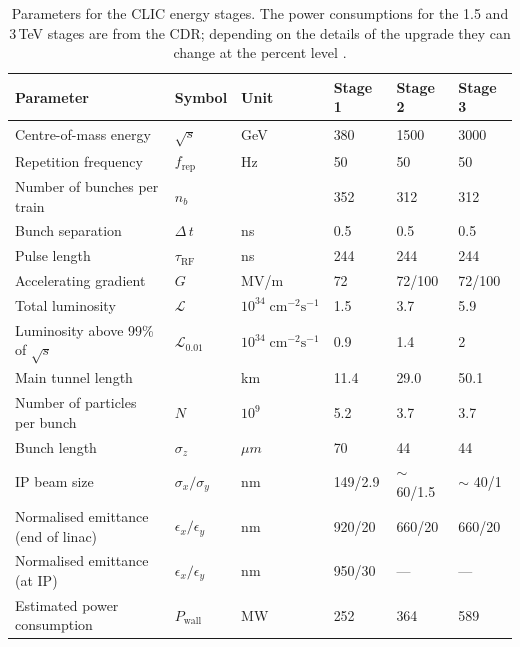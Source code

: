 \begin{table}
\caption[CLIC beam parameters]{Parameters for the CLIC energy stages. The power consumptions for the 1.5 and 3\,TeV stages are from the CDR; depending on the details of the upgrade they can change at the percent level \cite{CLIC:2016zwp}.}
\label{table:clicbeamparameters}
\centering
\begin{tabular}{l l l l l l}
\toprule
\textbf{Parameter}                  & \textbf{Symbol}         & \textbf{Unit}& \textbf{Stage 1} & \textbf{Stage 2} & \textbf{Stage 3} \\
\midrule
Centre-of-mass energy               & $\sqrt{s}$                &GeV                                        & 380 & 1500 & 3000\\
Repetition frequency                & $f_{\text{rep}}$        &Hz                                         & 50 & 50 & 50\\
Number of bunches per train         & $n_{b}$                 &                                           & 352 & 312 & 312\\
Bunch separation                    & $\Delta\,t$             &ns                                         & 0.5 & 0.5 & 0.5\\
Pulse length                        & $\tau_{\text{RF}}$      &ns                                         &244 &244 &244\\
\midrule
Accelerating gradient               & $G$                     &MV/m                                       & 72 & 72/100 & 72/100\\
\midrule
Total luminosity                    & $\mathcal{L}$           &$10^{34}\;\text{cm}^{-2}\text{s}^{-1}$     & 1.5 & 3.7 & 5.9 \\
Luminosity above 99\% of $\sqrt{s}$   & $\mathcal{L}_{0.01}$    &$10^{34}\;\text{cm}^{-2}\text{s}^{-1}$     & 0.9 & 1.4 & 2\\
\midrule
Main tunnel length                  &                         &km                                         & 11.4 & 29.0 & 50.1\\
Number of particles per bunch                    & $N$                     &$10^9$                                     & 5.2 & 3.7 & 3.7\\
Bunch length                        & $\sigma_z$              &$\mu m$                                  & 70 & 44 & 44\\
IP beam size                        & $\sigma_x/\sigma_y$     &nm                                         & 149/2.9 & $\sim$ 60/1.5 & $\sim$ 40/1\\
Normalised emittance (end of linac) & $\epsilon_x/\epsilon_y$ &nm                                         & 920/20 & 660/20 & 660/20\\
Normalised emittance (at IP)        & $\epsilon_x/\epsilon_y$ &nm                                         & 950/30 & ---    &---\\
Estimated power consumption                        & $P_{\text{wall}}$         &MW                                & 252    & 364    & 589\\
\bottomrule
\end{tabular}
\end{table}

